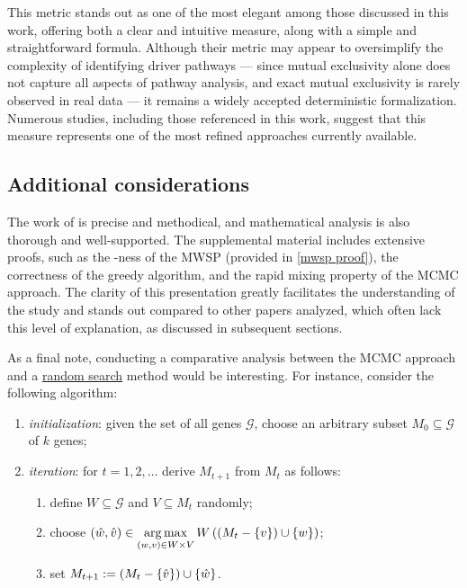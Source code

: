 This metric stands out as one of the most elegant among those discussed in this work, offering both a clear and intuitive measure, along with a simple and straightforward formula. Although their metric may appear to oversimplify the complexity of identifying driver pathways --- since mutual exclusivity alone does not capture all aspects of pathway analysis, and exact mutual exclusivity is rarely observed in real data --- it remains a widely accepted deterministic formalization. Numerous studies, including those referenced in this work, suggest that this measure represents one of the most refined approaches currently available.

\subsection{Additional considerations}

The work of \textcite{dendrix} is precise and methodical, and mathematical analysis is also thorough and well-supported. The supplemental material includes extensive proofs, such as the \NPHard-ness of the MWSP (provided in \cref{mwsp proof}), the correctness of the greedy algorithm, and the rapid mixing property of the MCMC approach. The clarity of this presentation greatly facilitates the understanding of the study and stands out compared to other papers analyzed, which often lack this level of explanation, as discussed in subsequent sections.

As a final note, conducting a comparative analysis between the MCMC approach and a \href{https://en.wikipedia.org/wiki/Random_search}{random search} method would be interesting. For instance, consider the following algorithm:

\begin{enumerate}
    \item \textit{initialization}: given the set of all genes $\mathcal G$, choose an arbitrary subset $M_0 \subseteq \mathcal G$ of $k$ genes;
    \item \textit{iteration}: for $t = 1, 2, \ldots$ derive $M_{t + 1}$ from $M_t$ as follows:

    \begin{enumerate}
        \item define $W \subseteq \mathcal G$ and $V \subseteq M_t$ randomly;
        \item choose $\displaystyle (\hat w, \hat v) \in \operatorname*{arg\,max}_{(w, v) \in W \times V}{W\left(\left(M_t - \{v\}\right) \cup \{w\}\right)}$;
        \item set $M_{t + 1} := \left(M_t - \{\hat v\}\right) \cup \{\hat w\}$.
    \end{enumerate}
\end{enumerate}

